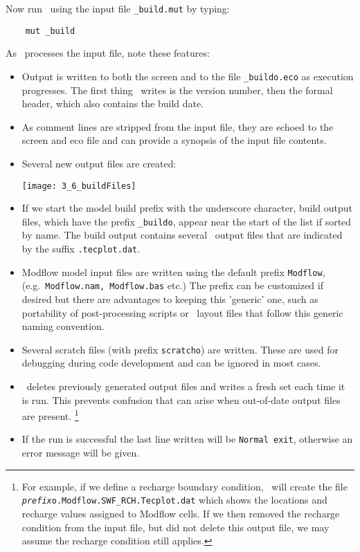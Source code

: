 Now run \mut\ using the input file \texttt{\_build.mut} by typing:
\begin{verbatim}
    mut _build
\end{verbatim}
As \mut\ processes the input file, note these features:
\begin{itemize}
    \item Output is written to both the screen and to the file \verb+_buildo.eco+ as execution progresses.  The first thing \mut\ writes is the version number, then the formal header, which also contains the build date.
    \item  As comment lines are stripped from the input file, they are echoed to the screen and eco file and can provide a synopsis of the input file contents.
    \item  Several new output files are created:

        \texttt{[image: 3\_6\_buildFiles]}

    \item If we start the model build prefix with the underscore character,  build output files, which have the prefix \texttt{\_buildo}, appear near the start of the list if sorted by name. The build output contains several \tecplot\ output files that are indicated by the suffix \texttt{.tecplot.dat}.
    \item Modflow model input files are written using the default prefix \texttt{Modflow}, (e.g.\ \texttt{Modflow.nam, Modflow.bas} etc.)  The prefix can be customized if desired but there are advantages to keeping this 'generic' one, such as portability of post-processing scripts or \tecplot\ layout files that follow this generic naming convention.
    \item Several scratch files (with prefix \texttt{scratcho}) are written. These are used for debugging during code development and can be ignored in most cases.
    \item \mut\ deletes previously generated output files and writes a fresh set each time it is run.  This prevents confusion that can arise when out-of-date output files are present.
        \footnote{For example, if we define a recharge boundary condition, \mut\ will create the file \texttt{\textit{prefix}o.Modflow.SWF\_RCH.Tecplot.dat} which shows the locations and recharge values assigned to Modflow cells.  If we then removed the recharge condition from the input file, but did not delete this output file, we may assume the recharge condition still applies.}
    \item If the run is successful the last line written will be \texttt{Normal exit}, otherwise an error message will be given.
\end{itemize}


